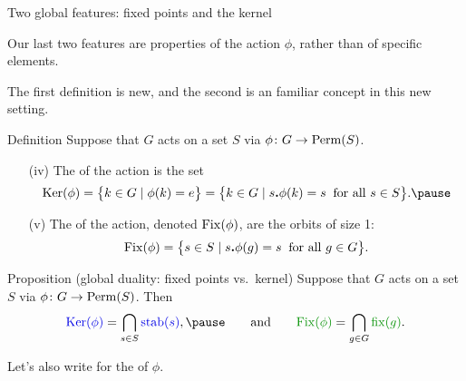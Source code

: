 \documentclass[8pt]{beamer}
\newcommand{\Pause}{\pause}      %
\begin{document}
\begin{frame}{Two global features: fixed points and the kernel} 

  Our last two features are properties of the action $\phi$, rather than of
  specific elements.
  
  \medskip\Pause
  
  The first definition is new, and the second is an familiar concept
  in this new setting. \Pause
  
  \begin{block}{Definition}
    Suppose that $G$ acts on a set $S$ via $\phi\colon G\to\operatorname{Perm}(S)$.  \Pause
    \begin{enumerate}[(i)]
    \item[(iv)] The  of the action is the set
      \[
      \Ker(\phi)=\big\{k\in G\mid\phi(k)=e\big\}=\big\{k\in G\mid s\Dot\phi(k)
      =s\;\;\text{for all } s\in S\big\}. \Pause
      \]
      \vspace{-3mm}
    \item[(v)] The  of the action, denoted
      $\operatorname{Fix}(\phi)$, are the orbits of size 1:
      \[
      \operatorname{Fix}(\phi)=\big\{s\in S\mid s\bm{.}\phi(g)
      =s\;\;\text{for all } g\in G\big\}.
      \]
    \end{enumerate}
  \end{block}
  
  \vspace{-1mm}\Pause
  
  \begin{block}{Proposition (global duality: fixed points vs.\ kernel)}
    Suppose that $G$ acts on a set $S$ via $\phi\colon G\to\operatorname{Perm}(S)$. \Pause
    Then
    \[
    \Balert{\Ker(\phi)}=\bigcap_{s\in
      S}\Balert{\stab(s)},\Pause\qquad\text{and}\qquad
    \Galert{\Fix(\phi)}=\bigcap_{g\in G}\Galert{\fix(g)}.
    \]
    \vspace{-2mm}
  \end{block}
  
  \smallskip\Pause
  
  Let's also write \Alert{$\Orb(\phi)$} for the 
  of $\phi$.

\end{frame}

\end{document}
